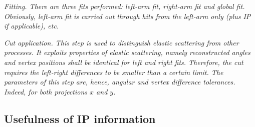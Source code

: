 \itm \em{Fitting}. There are three fits performed: left-arm fit, right-arm fit and global fit. Obviously, left-arm fit is carried out through hits from the left-arm only (plus IP if applicable), etc.

\itm \em{Cut application}. This step is used to distinguish elastic scattering from other processes. It exploits properties of elastic scattering, namely reconstructed angles and vertex positions shall be identical for left and right fits. Therefore, the cut requires the left-right differences to be smaller than a certain limit. The parameters of this step are, hence, angular and vertex difference tolerances. Indeed, for both projections $x$ and $y$.
\eitm

\break
\subsection[ip]{Usefulness of IP information}

